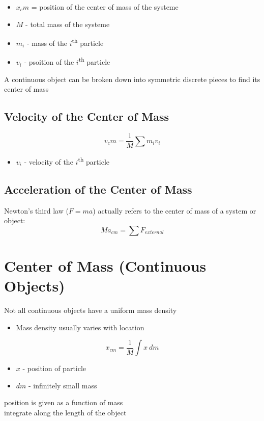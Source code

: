 \documentclass[titlepage]{article}
\begin{document}
\begin{itemize}
    \item $x_cm$ = position of the center of mass of the systeme
    \item $M$ - total mass of the systeme
    \item $m_i$ - mass of the $i$\textsuperscript{th} particle
    \item $v_i$ - psoition of the $i$\textsuperscript{th} particle
\end{itemize}

A continuous object can be broken down into symmetric discrete pieces to find its center of mass

\subsection{Velocity of the Center of Mass}
\[v_cm = \frac{1}{M}\sum m_i v_i\]

\begin{itemize}
    \item $v_i$ - velocity of the $i$\textsuperscript{th} particle
\end{itemize}

\subsection{Acceleration of the Center of Mass}
Newton's third law ($F = ma$) actually refers to the center of mass of a system or object:
\[Ma_{cm} = \sum F_{external}\]

\section{Center of Mass (Continuous Objects)}
Not all continuous objects have a uniform mass density
\begin{itemize}
    \item Mass density usually varies with location
\end{itemize}

\[x_{cm} = \frac{1}{M} \int x \ dm\]
\begin{itemize}
    \item $x$ - position of particle
    \item $dm$ - infinitely small mass
\end{itemize}
position is given as a function of mass\\
integrate along the length of the object
\end{document}
